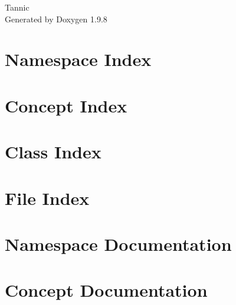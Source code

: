 \documentclass[twoside]{book}
\newcommand{\+}{\discretionary{\mbox{\scriptsize$\hookleftarrow$}}{}{}}
\newcommand{\clearemptydoublepage}{%
    \newpage{\pagestyle{empty}\cleardoublepage}%
  }
\begin{document}
  \raggedbottom
    \hypersetup{pageanchor=false,
                bookmarksnumbered=true,
                pdfencoding=unicode
               }
  \begin{titlepage}
  \vspace*{7cm}
  \begin{center}%
  {\Large Tannic}\\
  \vspace*{1cm}
  {\large Generated by Doxygen 1.9.8}\\
  \end{center}
  \end{titlepage}
  \clearemptydoublepage
  \tableofcontents
  \clearemptydoublepage
  \hypersetup{pageanchor=true}

\chapter{Namespace Index}

\chapter{Concept Index}

\chapter{Class Index}

\chapter{File Index}

\chapter{Namespace Documentation}






\chapter{Concept Documentation}






\end{document}
